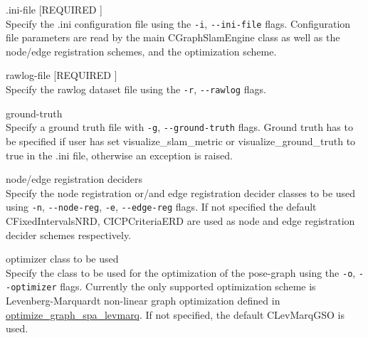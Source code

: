 \begin{description*}
    \item[.ini-file [REQUIRED] ]\hfill\\
        Specify the .ini configuration file using the \texttt{-i},
        \texttt{-\--ini-file} flags.
        Configuration file parameters are read by the main CGraphSlamEngine
        class as well as the node/edge registration schemes, and the
        optimization scheme.
    \item[rawlog-file [REQUIRED] ]\hfill\\
        Specify the rawlog dataset file using the \texttt{-r},
        \texttt{-\--rawlog} flags.
    \item[ground-truth]\hfill\\
        Specify a ground truth file with \texttt{-g}, \texttt{-\--ground-truth} flags. Ground truth
        has to be specified if user has set visualize\_slam\_metric or
        visualize\_ground\_truth to true in the .ini file, otherwise an
        exception is raised.
    \item[node/edge registration deciders]\hfill\\
        Specify the node registration or/and edge registration decider
        classes to be used using \texttt{-n}, \texttt{-\--node-reg},
        \texttt{-e}, \texttt{-\--edge-reg} flags. If not
        specified the default CFixedIntervalsNRD, CICPCriteriaERD are used
        as node and edge registration decider schemes respectively.
    \item[optimizer class to be used]\hfill\\
        Specify the class to be used for the optimization of the pose-graph
        using the \texttt{-o}, \texttt{-\--optimizer} flags. Currently the only supported
        optimization scheme is Levenberg-Marquardt non-linear graph
        optimization defined in
\href{http://reference.mrpt.org/devel/group\_\_mrpt\_\_graphslam\_\_grp.html\#ga022f4a70be5ec7c432f46374e4bb9d66}{optimize\_graph\_spa\_levmarq}. If not specified, the default CLevMarqGSO is used.
\end{description*}


